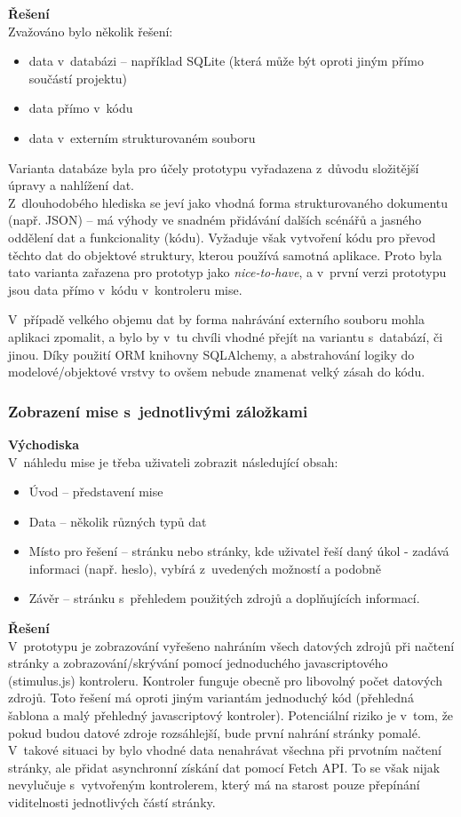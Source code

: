 	\textbf{Řešení}\\
	Zvažováno bylo několik řešení:
	
	\begin{itemize}
		\item data v~databázi -- například SQLite (která může být oproti jiným přímo součástí projektu)
		\item data přímo v~kódu
		\item data v~externím strukturovaném souboru
	\end{itemize}

	Varianta databáze byla pro účely prototypu vyřadazena z~důvodu složitější úpravy a nahlížení dat. \\
	Z~dlouhodobého hlediska se jeví jako vhodná forma strukturovaného dokumentu (např. JSON) -- má výhody ve snadném přidávání dalších scénářů a jasného oddělení dat a funkcionality (kódu). Vyžaduje však vytvoření kódu pro převod těchto dat do objektové struktury, kterou používá samotná aplikace.
	Proto byla tato varianta zařazena pro prototyp jako \textit{nice-to-have}, a v~první verzi prototypu jsou data přímo v~kódu v~kontroleru mise.

	V~případě velkého objemu dat by forma nahrávání externího souboru mohla aplikaci zpomalit, a bylo by v~tu chvíli vhodné přejít na variantu s~databází, či jinou. Díky použití ORM knihovny SQLAlchemy, a abstrahování logiky do modelové/objektové vrstvy to ovšem nebude znamenat velký zásah do kódu. 

\subsubsection*{Zobrazení mise s~jednotlivými záložkami}
	\textbf{Východiska}\\
	V~náhledu mise je třeba uživateli zobrazit následující obsah:
	
	\begin{itemize}
		\item Úvod -- představení mise
		\item Data -- několik různých typů dat
		\item Místo pro řešení -- stránku nebo stránky, kde uživatel řeší daný úkol - zadává informaci (např. heslo), vybírá z~uvedených možností a podobně
		\item Závěr -- stránku s~přehledem použitých zdrojů a doplňujících informací. 
	\end{itemize}	

	\textbf{Řešení}\\
	V~prototypu je zobrazování vyřešeno nahráním všech datových zdrojů při načtení stránky a zobrazování/skrývání pomocí jednoduchého javascriptového (stimulus.js) kontroleru. Kontroler funguje obecně pro libovolný počet datových zdrojů.
	Toto řešení má oproti jiným variantám jednoduchý kód (přehledná šablona a malý přehledný javascriptový kontroler).
	Potenciální riziko je v~tom, že pokud budou datové zdroje rozsáhlejší, bude první nahrání stránky pomalé. V~takové situaci by bylo vhodné data nenahrávat všechna při prvotním načtení stránky, ale přidat asynchronní získání dat pomocí Fetch API. To se však nijak nevylučuje s~vytvořeným kontrolerem, který má na starost pouze přepínání viditelnosti jednotlivých částí stránky.

